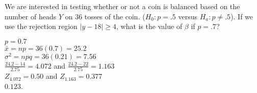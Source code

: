 \documentclass[answers]{exam}
\begin{document}
\begin{questions}
\begin{solution}
\end{solution}

\setcounter{question}{14}
	
\question 
We are interested in testing whether or not a coin is balanced based
 on the number of heads \(Y\) on 36 tosses of the coin. 
 (\(H_0 : p=.5\) versus \(H_a:p\neq.5\)). 
 If we use the rejection region \(|y-18|\geq4\), 
 what is the value of \(\beta\) if \(p=.7\)?
\begin{solution}
	\(p=0.7\)\\
	\(\bar{x}=np=36(0.7)=25.2\) \\
	\(\sigma^2=npq=36(0.21)=7.56\) \\
	\(\frac{24.2-14}{2.75}=4.072\) and \(\frac{24.2-22}{2.75}=1.163\) \\
	\(Z_{4.072}=0.50\) and \(Z_{1.163}=0.377\) \\
	\(0.123\).
\end{solution} 

\clearpage


\end{questions}
\end{document}

